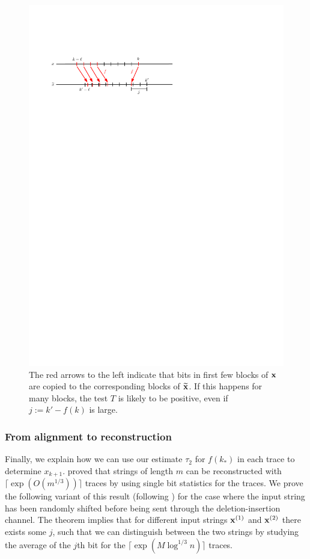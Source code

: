 \documentclass[final,12pt]{colt2018} %
\newcommand{\1}{\mathbf{1}}
\newcommand{\wt}{\widetilde}
\def\xt{{\wt {\bf x}}}
\def\x{{\bf x}}
\begin{document}
\begin{figure}
	\centering
	\includegraphics[scale=1]{overlap}
	\caption{The red arrows to the left indicate that bits in first few blocks of $\x$ are copied to the corresponding blocks of $\xt$. If this happens for many blocks, the test $T$ is likely to be positive, even if $j:=k'-f(k)$ is large. }
	\label{fig2}
\end{figure}



\subsubsection*{From alignment to reconstruction}
Finally, we explain how we can use our estimate $\tau_2$ for $f(k_*)$ in each trace to determine $x_{k+1}$. \cite{DOS16,NP16} proved that strings of length $m$ can be reconstructed with $\lceil\exp(O(m^{1/3}))\rceil$ traces by using single bit statistics for the traces. We prove the following variant of this result (following \cite{PZ17}) for the case where the input string has been randomly shifted before being sent through the deletion-insertion channel. The theorem implies that for different input strings $\x^{(1)}$ and $\x^{(2)}$ there exists some $j$, such that we can distinguish between the two strings by studying the average of the $j$th bit for the $\lceil\exp(M\log^{1/3}n)\rceil$ traces.
\end{document}
